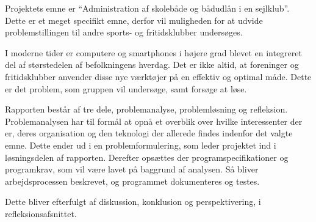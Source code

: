 Projektets emne er ``Administration af skolebåde og bådudlån i en sejlklub''.
Dette er et meget specifikt emne, derfor vil muligheden for at udvide problemstillingen til andre sports- og fritidsklubber undersøges.

I moderne tider er computere og smartphones i højere grad blevet en integreret del af størstedelen af befolkningens hverdag. 
Det er ikke altid, at foreninger og fritidsklubber anvender disse nye værktøjer på en effektiv og optimal måde. 
Dette er det problem, som gruppen vil undersøge, samt forsøge at løse.

Rapporten består af tre dele, problemanalyse, problemløsning og refleksion. 
Problemanalysen har til formål at opnå et overblik over hvilke interessenter der er, deres organisation og den teknologi der allerede findes indenfor det valgte emne. 
Dette ender ud i en problemformulering, som leder projektet ind i løsningsdelen af rapporten. 
Derefter opsættes der programspecifikationer og programkrav, som vil være lavet på baggrund af analysen. 
Så bliver arbejdsprocessen beskrevet, og programmet dokumenteres og testes. 

Dette bliver efterfulgt af diskussion, konklusion og perspektivering, i refleksionsafsnittet.

